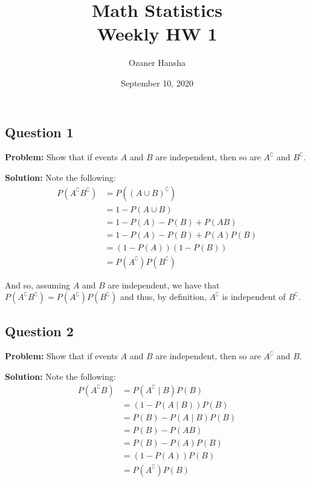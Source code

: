 \documentclass{article}
\begin{document}
\title{Math Statistics\\ Weekly HW 1}
\author{Ozaner Hansha}
\date{September 10, 2020}
\maketitle

\subsection*{Question 1}
\noindent\textbf{Problem:} Show that if events $A$ and $B$ are independent, then so are $A^\complement$ and $B^\complement$.
\bigskip

\noindent\textbf{Solution:} Note the following:
\begin{align*}
  P(A^\complement B^\complement)&=P((A\cup B)^\complement)\tag{DeMorgan's Law}\\
  &=1-P(A\cup B)\tag{prob. of complement}\\
  &=1-P(A)-P(B)+P(AB)\tag{inclusion-exclusion principle}\\
  &=1-P(A)-P(B)+P(A)P(B)\tag{independence of $A$ and $B$}\\
  &=(1-P(A))(1-P(B))\tag{factorization}\\
  &=P(A^\complement)P(B^\complement)\tag{prob. of complement}
\end{align*}

And so, assuming $A$ and $B$ are independent, we have that $P(A^\complement B^\complement)=P(A^\complement)P(B^\complement)$ and thus, by definition, $A^\complement$ is independent of $B^\complement$.
\smallskip

\subsection*{Question 2}
\noindent\textbf{Problem:} Show that if events $A$ and $B$ are independent, then so are $A^\complement$ and $B$.
\bigskip

\noindent\textbf{Solution:} Note the following:
\begin{align*}
  P(A^\complement B)&=P(A^\complement\mid B)P(B)\tag{chain rule}\\
  &=(1-P(A\mid B))P(B)\tag{prob. of complement}\\
  &=P(B)-P(A\mid B)P(B)\tag{multiplicative distributivity}\\
  &=P(B)-P(AB)\tag{chain rule}\\
  &=P(B)-P(A)P(B)\tag{independence of $A$ and $B$}\\
  &=(1-P(A))P(B)\tag{multiplicative distributivity}\\
  &=P(A^\complement)P(B)\tag{prob. of complement}
\end{align*}
\end{document}
